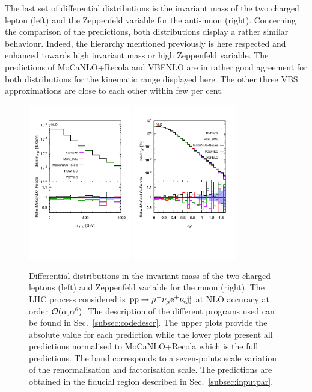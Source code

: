 The last set of differential distributions is the invariant mass of the two charged lepton (left) and the Zeppenfeld variable for the anti-muon (right).
Concerning the comparison of the predictions, both distributions display a rather similar behaviour.
Indeed, the hierarchy mentioned previously is here respected and enhanced towards high invariant mass or high Zeppenfeld variable.
The predictions of {\sc MoCaNLO}+{\sc Recola} and {\sc VBFNLO} are in rather good agreement for both distributions for the kinematic range displayed here.
The other three VBS approximations are close to each other within few per cent.

 \begin{figure}[hbt!]
   \centering
   \includegraphics[width=0.4\textwidth,angle=0,clip=true,trim={0.4cm 2cm 0.cm 1.cm}]{figures/NLO/mll_NLO.pdf}
   \includegraphics[width=0.4\textwidth,angle=0,clip=true,trim={0.4cm 2cm 0.cm 1.cm}]{figures/NLO/zmu_NLO.pdf}
\caption{\label{fig:distNLO3} Differential distributions in the invariant mass of the two charged leptons (left) and Zeppenfeld variable for the muon (right).
The LHC process considered is ${\rm p}{\rm p}\to\mu^+\nu_\mu{\rm e}^+\nu_{\rm e}{\rm j}{\rm j}$ at NLO accuracy at order $\mathcal{O}(\alpha_{\rm s}\alpha^6)$.
The description of the different programs used can be found in Sec.~\ref{subsec:codedescr}.
The upper plots provide the absolute value for each prediction while the lower plots present all predictions normalised to {\sc MoCaNLO}+{\sc Recola} which is the full predictions.
The band corresponds to a seven-points scale variation of the renormalisation and factorisation scale.
The predictions are obtained in the fiducial region described in Sec.~\ref{subsec:inputpar}.
}
\end{figure}

